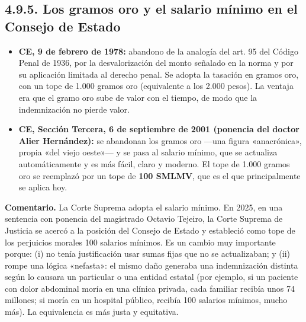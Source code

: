 \subsection{4.9.5. Los gramos oro y el salario mínimo en el Consejo de Estado}
\begin{itemize}
\item \textbf{CE, 9 de febrero de 1978:} abandono de la analogía del art. 95 del Código Penal de 1936, por la desvalorización del monto señalado en la norma y por su aplicación limitada al derecho penal. Se adopta la tasación en gramos oro, con un tope de 1.000 gramos oro (equivalente a los 2.000 pesos). La ventaja era que el gramo oro sube de valor con el tiempo, de modo que la indemnización no pierde valor.
\item \textbf{CE, Sección Tercera, 6 de septiembre de 2001 (ponencia del doctor Alier Hernández):} se abandonan los gramos oro —una figura «anacrónica», propia «del viejo oeste»— y se pasa al salario mínimo, que se actualiza automáticamente y es más fácil, claro y moderno. El tope de 1.000 gramos oro se reemplazó por un tope de \textbf{100 SMLMV}, que es el que principalmente se aplica hoy.
\end{itemize}
\begin{comentario}
\textcolor[HTML]{8A6D3B}{\textbf{Comentario. }}La Corte Suprema adopta el salario mínimo. En 2025, en una sentencia con ponencia del magistrado Octavio Tejeiro, la Corte Suprema de Justicia se acercó a la posición del Consejo de Estado y estableció como tope de los perjuicios morales 100 salarios mínimos. Es un cambio muy importante porque: (i) no tenía justificación usar sumas fijas que no se actualizaban; y (ii) rompe una lógica «nefasta»: el mismo daño generaba una indemnización distinta según lo causara un particular o una entidad estatal (por ejemplo, si un paciente con dolor abdominal moría en una clínica privada, cada familiar recibía unos 74 millones; si moría en un hospital público, recibía 100 salarios mínimos, mucho más). La equivalencia es más justa y equitativa.
\end{comentario}
